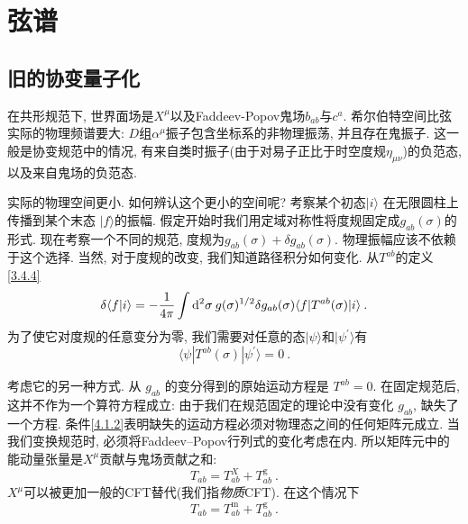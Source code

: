 
\chapter{\texorpdfstring{弦谱}{4 The string spectrum}} \label{cha:4}

\section{\texorpdfstring{旧的协变量子化}{4.1 Old covariant quantization}} \label{sec:4.1}

在共形规范下, 世界面场是$X^{\mu}$以及Faddeev-Popov鬼场$b_{a b}$与$c^{a}$. 希尔伯特空间比弦实际的物理频谱要大: $D$组$\alpha^{\mu}$振子包含坐标系的非物理振荡, 并且存在鬼振子. 
这一般是协变规范中的情况, 有来自类时振子(由于对易子正比于时空度规$\eta_{\mu \nu}$)的负范态, 以及来自鬼场的负范态.

实际的物理空间更小. 如何辨认这个更小的空间呢? 考察某个初态$\lvert i\rangle$ 在无限圆柱上传播到某个末态 $\lvert f\rangle $的振幅.  假定开始时我们用定域对称性将度规固定成$g_{a b}(\sigma)$的形式. 
现在考察一个不同的规范, 度规为$g_{a b}(\sigma)+\delta g_{a b}(\sigma)$. 物理振幅应该不依赖于这个选择. 当然, 对于度规的改变, 我们知道路径积分如何变化. 从$T^{a b}$的定义\eqref{3.4.4} 
\begin{equation}
\delta\langle f | i\rangle=-\frac{1}{4 \pi} \int \mathrm{d}^{2} \sigma\: g(\sigma)^{1 / 2} \delta g_{a b}(\sigma) \langle f |T^{a b}(\sigma)| i\rangle \:. \label{4.1.1}
\end{equation}
为了使它对度规的任意变分为零, 我们需要对任意的态$|\psi\rangle$和$\lvert\psi^{\prime}\rangle$有
\begin{equation}\label{4.1.2}
\langle\psi|T^{a b}(\sigma)| \psi^{\prime}\rangle=0 \:.
\end{equation}

考虑它的另一种方式.  从 $g_{a b}$ 的变分得到的原始运动方程是 $T^{a b}=0$.  在固定规范后, 这并不作为一个算符方程成立: 由于我们在规范固定的理论中没有变化 $g_{a b}$, 缺失了一个方程. 条件\eqref{4.1.2}表明缺失的运动方程必须对物理态之间的任何矩阵元成立. 当我们变换规范时, 必须将Faddeev–Popov行列式的变化考虑在内. 所以矩阵元中的能动量张量是$X^\mu$贡献与鬼场贡献之和: 
\begin{equation}
T_{a b}=T_{a b}^{X}+T_{a b}^{\mathrm{g}} \:. \label{4.1.3}
\end{equation}
$X^\mu$可以被更加一般的CFT替代(我们指\emph{物质}CFT). 在这个情况下
\begin{equation}
T_{a b}=T_{a b}^{\mathrm{m}}+T_{a b}^{\mathrm{g}} \:. \label{4.1.4}
\end{equation}

